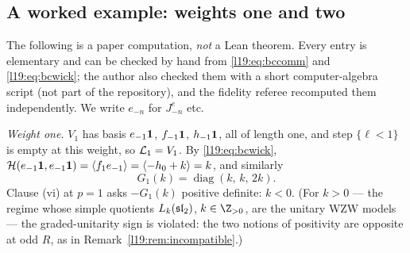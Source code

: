 \subsection{A worked example: weights one and two}

\begin{example}\label{l19:ex:bcweight2}
The following is a paper computation, \emph{not} a Lean theorem. Every entry is elementary and can be checked by hand
from \eqref{l19:eq:bccomm} and \eqref{l19:eq:bcwick}; the author also checked them with a short computer-algebra script
(not part of the repository), and the fidelity referee recomputed them independently. We write $e_{-n}$ for
$J^e_{-n}$ etc.

\emph{Weight one.} $V_1$ has basis $e_{-1}\mathbf{1}$, $f_{-1}\mathbf{1}$, $h_{-1}\mathbf{1}$, all of length one, and
step $\{\ell<1\}$ is empty at this weight, so $\mathcal{L}_1 = V_1$. By \eqref{l19:eq:bcwick},
$\mathcal H(e_{-1}\mathbf{1},e_{-1}\mathbf{1}) = \langle f_1e_{-1}\rangle = \langle -h_0+k\rangle = k$, and similarly
\begin{equation*}
  G_1(k) = \operatorname{diag}(k,\,k,\,2k).
\end{equation*}
Clause (vi) at $p = 1$ asks $-G_1(k)$ positive definite: $k<0$. (For $k>0$ --- the regime whose simple quotients
$L_k(\mathfrak{sl}_2)$, $k\in\Z_{>0}$, are the unitary WZW models --- the graded-unitarity sign is violated: the two notions of positivity are opposite at odd $R$, as in
Remark~\ref{l19:rem:incompatible}.)


\end{example}
